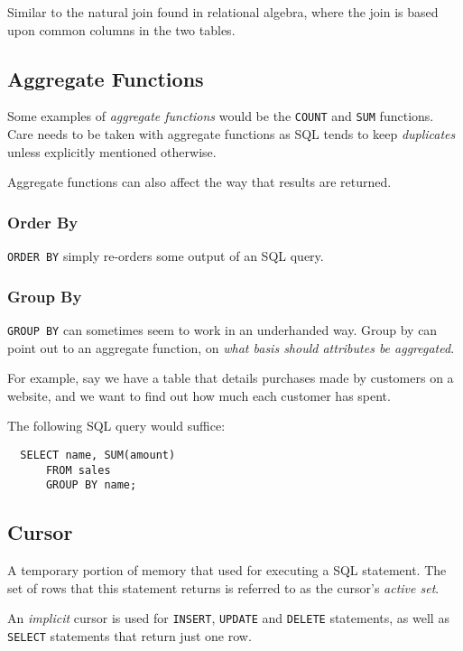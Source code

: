 \documentclass{article}
\begin{document}
Similar to the natural join found in relational algebra, where the join is based upon common columns in the two tables.

\filbreak
\subsection{Aggregate Functions}

Some examples of \textit{aggregate functions} would be the \texttt{COUNT} and \texttt{SUM} functions. Care needs to be taken with aggregate functions as SQL tends to keep \textit{duplicates} unless explicitly mentioned otherwise. 

Aggregate functions can also affect the way that results are returned.

\subsubsection{Order By}

\texttt{ORDER BY} simply re-orders some output of an SQL query. 

\subsubsection{Group By}

\texttt{GROUP BY} can sometimes seem to work in an underhanded way. Group by can point out to an aggregate function, on \textit{what basis should attributes be aggregated}.

For example, say we have a table that details purchases made by customers on a website, and we want to find out how much each customer has spent.

The following SQL query would suffice:

\begin{lstlisting}
  SELECT name, SUM(amount)
      FROM sales
      GROUP BY name;
\end{lstlisting}

\subsection{Cursor}

A temporary portion of memory that used for executing a SQL statement. The set of rows that this statement returns is referred to as the cursor's \textit{active set}.

An \textit{implicit} cursor is used for \texttt{INSERT}, \texttt{UPDATE} and \texttt{DELETE} statements, as well as \texttt{SELECT} statements that return just one row.
\end{document}
